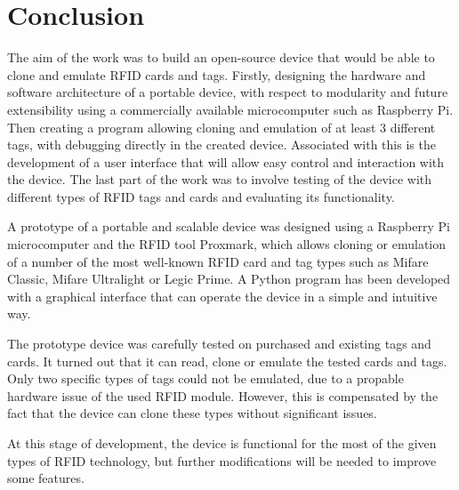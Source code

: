 \chapter{Conclusion}

The aim of the work was to build an open-source device that would be able to clone and emulate RFID cards and tags. Firstly, designing the hardware and software architecture of a portable device, with respect to modularity and future extensibility using a commercially available microcomputer such as Raspberry Pi. Then creating a program allowing cloning and emulation of at least 3 different tags, with debugging directly in the created device. Associated with this is the development of a user interface that will allow easy control and interaction with the device. The last part of the work was to involve testing of the device with different types of RFID tags and cards and evaluating its functionality.

A prototype of a portable and scalable device was designed using a Raspberry Pi microcomputer and the RFID tool Proxmark, which allows cloning or emulation of a number of the most well-known RFID card and tag types such as Mifare Classic, Mifare Ultralight or Legic Prime. A Python program has been developed with a graphical interface that can operate the device in a simple and intuitive way.

The prototype device was carefully tested on purchased and existing tags and cards. It turned out that it can read, clone or emulate the tested cards and tags. Only two specific types of tags could not be emulated, due to a propable hardware issue of the used RFID module. However, this is compensated by the fact that the device can clone these types without significant issues.

At this stage of development, the device is functional for the most of the given types of RFID technology, but further modifications will be needed to improve some features.
